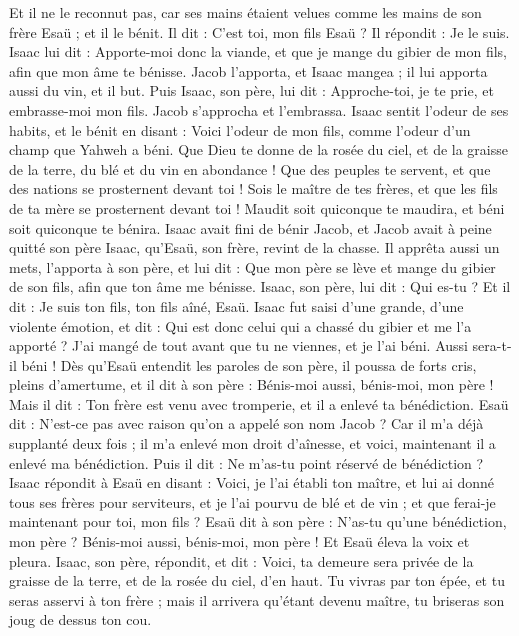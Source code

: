 \begin{multicols}{2}
Et il ne le reconnut pas, car ses mains étaient velues comme les mains de son frère Esaü ; et il le bénit.
Il dit : C’est toi, mon fils Esaü ? Il répondit : Je le suis.
Isaac lui dit : Apporte-moi donc la viande, et que je mange du gibier de mon fils, afin que mon âme te bénisse. Jacob l'apporta, et Isaac mangea ; il lui apporta aussi du vin, et il but.
Puis Isaac, son père, lui dit : Approche-toi, je te prie, et embrasse-moi mon fils.
Jacob s'approcha et l’embrassa. Isaac sentit l'odeur de ses habits, et le bénit en disant : Voici l'odeur de mon fils, comme l'odeur d'un champ que Yahweh a béni.
Que Dieu te donne de la rosée du ciel, et de la graisse de la terre, du blé et du vin en abondance !
Que des peuples te servent, et que des nations se prosternent devant toi ! Sois le maître de tes frères, et que les fils de ta mère se prosternent devant toi ! Maudit soit quiconque te maudira, et béni soit quiconque te bénira.
Isaac avait fini de bénir Jacob, et Jacob avait à peine quitté son père Isaac, qu’Esaü, son frère, revint de la chasse.
Il apprêta aussi un mets, l’apporta à son père, et lui dit : Que mon père se lève et mange du gibier de son fils, afin que ton âme me bénisse.
Isaac, son père, lui dit : Qui es-tu ? Et il dit : Je suis ton fils, ton fils aîné, Esaü.
Isaac fut saisi d'une grande, d’une violente émotion, et dit : Qui est donc celui qui a chassé du gibier et me l’a apporté ? J'ai mangé de tout avant que tu ne viennes, et je l'ai béni. Aussi sera-t-il béni !
Dès qu'Esaü entendit les paroles de son père, il poussa de forts cris, pleins d’amertume, et il dit à son père : Bénis-moi aussi, bénis-moi, mon père !
Mais il dit : Ton frère est venu avec tromperie, et il a enlevé ta bénédiction.
Esaü dit : N'est-ce pas avec raison qu'on a appelé son nom Jacob ? Car il m'a déjà supplanté deux fois ; il m'a enlevé mon droit d'aînesse, et voici, maintenant il a enlevé ma bénédiction. Puis il dit : Ne m'as-tu point réservé de bénédiction ?
Isaac répondit à Esaü en disant : Voici, je l'ai établi ton maître, et lui ai donné tous ses frères pour serviteurs, et je l'ai pourvu de blé et de vin ; et que ferai-je maintenant pour toi, mon fils ?
Esaü dit à son père : N'as-tu qu'une bénédiction, mon père ? Bénis-moi aussi, bénis-moi, mon père ! Et Esaü éleva la voix et pleura.
Isaac, son père, répondit, et dit : Voici, ta demeure sera privée de la graisse de la terre, et de la rosée du ciel, d'en haut.
Tu vivras par ton épée, et tu seras asservi à ton frère ; mais il arrivera qu'étant devenu maître, tu briseras son joug de dessus ton cou.

\end{multicols}
